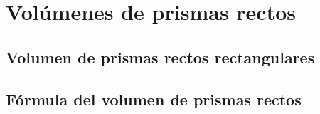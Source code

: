 \thispagestyle{plain}

\section{Vol\'umenes de prismas rectos}

\subsection{Volumen de prismas rectos rectangulares}

\subsection{Fórmula del volumen de prismas rectos}


\newpage